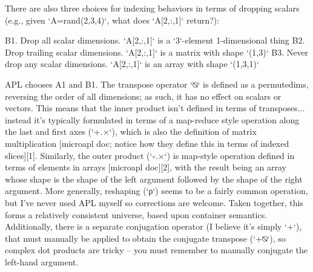There are also three choices for indexing behaviors in terms of dropping
scalars (e.g., given `A=rand(2,3,4)`, what does `A[2,:,1]` return?):

B1. Drop all scalar dimensions. `A[2,:,1]` is a `3`-element 1-dimensional thing
B2. Drop trailing scalar dimensions. `A[2,:,1]` is a matrix with shape `(1,3)`
B3. Never drop any scalar dimensions. `A[2,:,1]` is an array with shape `(1,3,1)`

APL chooses A1 and B1. The transpose operator `⍉` is defined as a permutedims,
reversing the order of all dimensions; as such, it has no effect on scalars or
vectors. This means that the inner product isn't defined in terms of
transposes... instead it's typically formulated in terms of a map-reduce style
operation along the last and first axes (`+.×`), which is also the definition
of matrix multiplication [microapl doc; notice how they define this in terms of
indexed slices][1]. Similarly, the outer product (`∘.×`) is map-style operation
defined in terms of elements in arrays [microapl doc][2], with the result being
an array whose shape is the shape of the left argument followed by the shape of
the right argument. More generally, reshaping (`ρ`) seems to be a fairly common
operation, but I've never used APL myself so corrections are welcome. Taken
together, this forms a relatively consistent universe, based upon container
semantics. Additionally, there is a separate conjugation operator (I believe
it's simply `+`), that must manually be applied to obtain the conjugate
transpose (`+⍉`), so complex dot products are tricky -- you must remember to
manually conjugate the left-hand argument.

